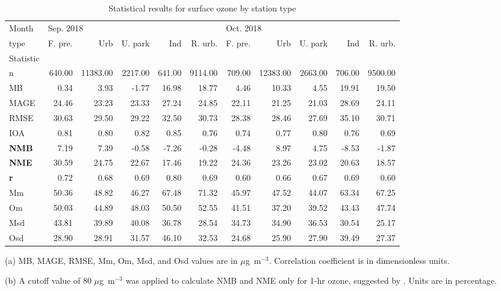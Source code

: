 \begin{table}
\begin{threeparttable}[b]
\centering
\caption{Statistical results for surface ozone by station type}
\label{tab: o3_sta}
\begin{tabular}{lrrrrrrrrrr}
\toprule
Month & \multicolumn{5}{l}{Sep. 2018} & \multicolumn{5}{l}{Oct. 2018} \\
type &   F. pre. &       Urb &  U. park &     Ind &  R. urb. &   F. pre. &       Urb &  U. park &     Ind &  R. urb. \\
Statistic\tnote{(a)} \\
\midrule
n    	&    640.00 &  11383.00 &  2217.00 &  641.00 &  9114.00 &    709.00 &  12383.00 &  2663.00 &  706.00 &  9500.00 \\
MB   	&      0.34 &      3.93 &    -1.77 &   16.98 &    18.77 &      4.46 &     10.33 &     4.55 &   19.91 &    19.50 \\
MAGE 	&     24.46 &     23.23 &    23.33 &   27.24 &    24.85 &     22.11 &     21.25 &    21.03 &   28.69 &    24.11 \\
RMSE 	&     30.63 &     29.50 &    29.22 &   32.50 &    30.73 &     28.38 &     28.46 &    27.69 &   35.10 &    30.71 \\
IOA  	&      0.81 &      0.80 &     0.82 &    0.85 &     0.76 &      0.74 &      0.77 &     0.80 &    0.76 &     0.69 \\
\bf NMB\tnote{(b)} &      7.19 &      7.39 &    -0.58 &   -7.26 &    -0.28 &     -4.48 &      8.97 &     4.75 &   -8.53 &    -1.87 \\
\bf NME\tnote{(b)} &     30.59 &     24.75 &    22.67 &   17.46 &    19.22 &     24.36 &     23.26 &    23.02 &   20.63 &    18.57 \\
\bf r   &      0.72 &      0.68 &     0.69 &    0.80 &     0.69 &      0.60 &      0.66 &     0.67 &    0.69 &     0.60 \\
Mm   	&     50.36 &     48.82 &    46.27 &   67.48 &    71.32 &     45.97 &     47.52 &    44.07 &   63.34 &    67.25 \\
Om   	&     50.03 &     44.89 &    48.03 &   50.50 &    52.55 &     41.51 &     37.20 &    39.52 &   43.43 &    47.74 \\
Msd  	&     43.81 &     39.89 &    40.08 &   36.78 &    28.54 &     34.73 &     34.90 &    36.53 &   30.54 &    25.17 \\
Osd  	&     28.90 &     28.91 &    31.57 &   46.10 &    32.53 &     24.68 &     25.90 &    27.90 &   39.49 &    27.37 \\
\bottomrule
\end{tabular}
\begin{tablenotes}
{\scriptsize
	\item[(a)] MB, MAGE, RMSE, Mm, Om, Msd, and Osd values are in $\mu$g~m$^{-3}$. Correlation coefficient is in dimensionless units.
	\item[(b)] A cutoff value of 80 $\mu$g~m$^{-3}$ was applied to calculate NMB and NME only for 1-hr ozone, suggested by \citet{Emery2017}. Units are in percentage.}
\end{tablenotes}
\end{threeparttable}
\end{table}

